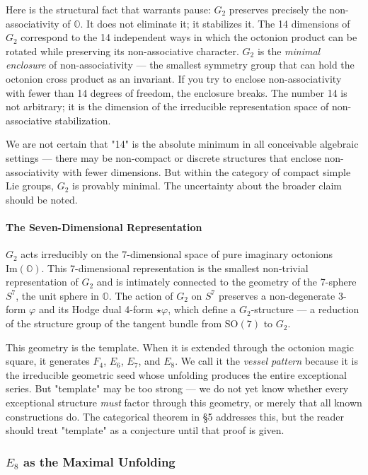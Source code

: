 \documentclass[12pt,a4paper]{article}
\newcommand{\pilcrow}{\S}
\begin{document}
Here is the structural fact that warrants pause: $G_2$ preserves precisely the non-associativity of $\mathbb{O}$. It does not eliminate it; it stabilizes it. The 14 dimensions of $G_2$ correspond to the 14 independent ways in which the octonion product can be rotated while preserving its non-associative character. $G_2$ is the \emph{minimal enclosure} of non-associativity --- the smallest symmetry group that can hold the octonion cross product as an invariant. If you try to enclose non-associativity with fewer than 14 degrees of freedom, the enclosure breaks. The number 14 is not arbitrary; it is the dimension of the irreducible representation space of non-associative stabilization.

We are not certain that "14" is the absolute minimum in all conceivable algebraic settings --- there may be non-compact or discrete structures that enclose non-associativity with fewer dimensions. But within the category of compact simple Lie groups, $G_2$ is provably minimal. The uncertainty about the broader claim should be noted.

\paragraph{The Seven-Dimensional Representation}

$G_2$ acts irreducibly on the 7-dimensional space of pure imaginary octonions $\text{Im}(\mathbb{O})$. This 7-dimensional representation is the smallest non-trivial representation of $G_2$ and is intimately connected to the geometry of the 7-sphere $S^7$, the unit sphere in $\mathbb{O}$. The action of $G_2$ on $S^7$ preserves a non-degenerate 3-form $\varphi$ and its Hodge dual 4-form $\star\varphi$, which define a $G_2$-structure --- a reduction of the structure group of the tangent bundle from $\text{SO}(7)$ to $G_2$.

This geometry is the template. When it is extended through the octonion magic square, it generates $F_4$, $E_6$, $E_7$, and $E_8$. We call it the \emph{vessel pattern} because it is the irreducible geometric seed whose unfolding produces the entire exceptional series. But "template" may be too strong --- we do not yet know whether every exceptional structure \emph{must} factor through this geometry, or merely that all known constructions do. The categorical theorem in \pilcrow{}5 addresses this, but the reader should treat "template" as a conjecture until that proof is given.

\subsubsection{$E_8$ as the Maximal Unfolding}
\end{document}
